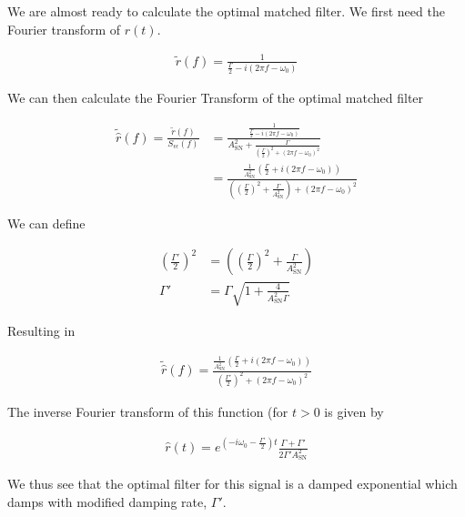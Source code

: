 \documentclass[12pt]{article}
\begin{document}
We are almost ready to calculate the optimal matched filter. We first need the Fourier transform of $r(t)$.

\begin{align}
\tilde{r}(f) = \frac{1}{\frac{\Gamma}{2} - i(2\pi f - \omega_0)}
\end{align}

We can then calculate the Fourier Transform of the optimal matched filter

\begin{align}
\tilde{\hat{r}}(f) = \frac{\tilde{r}(f)}{S_{\epsilon \epsilon}(f)} &= \frac{\frac{1}{\frac{\Gamma}{2} - i(2\pi f-\omega_0)}}{A_{\text{SN}}^2 + \frac{\Gamma}{\left( \frac{\Gamma}{2}\right)^2 + (2 \pi f - \omega_0)^2}}\\
&= \frac{\frac{1}{A_{\text{SN}}^2} \left(\frac{\Gamma}{2} + i (2\pi f - \omega_0) \right)}{\left(\left(\frac{\Gamma}{2}\right)^2 + \frac{\Gamma}{A_{\text{SN}}^2}\right) + (2\pi f - \omega_0)^2}
\end{align}

We can define

\begin{align}
\left(\frac{\Gamma'}{2}\right)^2 &= \left(\left(\frac{\Gamma}{2}\right)^2 + \frac{\Gamma}{A_{\text{SN}}^2} \right)\\
\Gamma' &= \Gamma \sqrt{1+\frac{4}{A_{\text{SN}}^2 \Gamma}}
\end{align}

Resulting in

\begin{align}
\tilde{\hat{r}}(f) = \frac{\frac{1}{A_{\text{SN}}^2} \left(\frac{\Gamma}{2} + i (2\pi f - \omega_0) \right)}{\left(\frac{\Gamma'}{2}\right)^2 + (2\pi f - \omega_0)^2}
\end{align}

The inverse Fourier transform of this function (for $t>0$ is given by

\begin{align}
\hat{r}(t) = e^{\left(-i\omega_0-\frac{\Gamma'}{2}\right) t} \frac{\Gamma + \Gamma'}{2 \Gamma' A_{\text{SN}}^2}
\end{align}

We thus see that the optimal filter for this signal is a damped exponential which damps with modified damping rate, $\Gamma'$.
\end{document}
